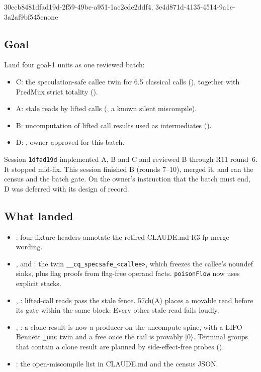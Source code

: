 %
  {30ecb848}{1dfad19d-2f59-49bc-a951-1ac2cde2ddf4, 3e4d871d-4135-4514-9a1e-3a2af9bf545c}{none}

\subsection*{Goal}
Land four goal-1 units as one reviewed batch:
\begin{itemize}
\item C: the speculation-safe callee twin for 6.5 classical calls (), together with PredMux strict totality ().
\item A: stale reads by lifted calls (, a known silent miscompile).
\item B: uncomputation of lifted call results used as intermediates ().
\item D: , owner-approved for this batch.
\end{itemize}
Session \texttt{1dfad19d} implemented A, B and C and reviewed B through R11 round~6. It stopped mid-fix. This session finished B (rounds 7--10), merged it, and ran the census and the batch gate. On the owner's instruction that the batch must end, D was deferred with its design of record.

\subsection*{What landed}
\begin{itemize}
\item {}: four fixture headers annotate the retired CLAUDE.md R3 fp-merge wording.
\item {},  and : the twin \texttt{\_\_cq\_specsafe\_<callee>}, which freezes the callee's noundef sinks, plus flag proofs from flag-free operand facts. \texttt{poisonFlow} now uses explicit stacks.
\item {}, : lifted-call reads pass the stale fence. 57ch(A) places a movable read before its gate within the same block. Every other stale read fails loudly.
\item {}, : a clone result is now a producer on the uncompute spine, with a LIFO Bennett \texttt{\_unc} twin and a free once the rail is provably $|0\rangle$. Terminal groups that contain a clone result are planned by side-effect-free probes ().
\item {}: the open-miscompile list in CLAUDE.md and the census JSON.
\end{itemize}

